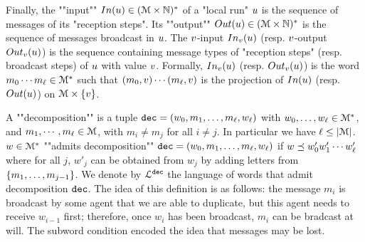 	Finally, the ""input"" $\Input{\localrun} \in (\messages \times \nats)^*$ of a "local run" $u$ is the sequence of messages of its "reception steps". Its ""output"" $\Output{\localrun} \in (\messages \times \nats)^*$ is the sequence of messages broadcast in $u$. The $v$-input $\vinput{\aval}{\localrun}$ (resp. $v$-output $\voutput{\aval}{\localrun}$) is the sequence containing message types of "reception steps" (resp. broadcast steps) of $u$ with value $v$. Formally, $\vinput{\aval}{\localrun}$ (resp. $\voutput{\aval}{\localrun}$) is the word $m_0 \cdots m_{\ell} \in \mathcal{M}^*$ such that $(m_0, v) \cdots (m_{\ell}, v)$ is the projection of $\Input{\localrun}$ (resp. $\Output{\localrun}$) on $\mathcal{M} \times \{v\}$. 
 
	A ""decomposition"" is a tuple $\mathtt{dec} = (w_0, m_1, \ldots, m_\ell, w_\ell)$ with $w_0, \ldots, w_\ell \in \mathcal{M}^*$, and $m_1, \cdots, m_\ell \in \mathcal{M}$, with $m_i \neq m_j$ for all $i\neq j$. In particular we have $\ell \leq |\mathcal{M}|$. 
	$w \in \mathcal{M}^*$ ""admits decomposition"" $\mathtt{dec} = (w_0, m_1, \ldots, m_\ell, w_\ell)$ if $w \preceq w'_0 w'_1 \cdots w'_\ell$ where for all $j$, $w'_j$ can be obtained from $w_j$ by adding letters from $\{m_1, \ldots, m_{j-1}\}$. 
	We denote by $\mathcal{L}^{\mathtt{\mathtt{dec}}}$ the language of words that admit decomposition $\mathtt{dec}$. 
	The idea of this definition is as follows: the message $m_i$ is broadcast by some agent that we are able to duplicate, but this agent needs to receive $w_{i-1}$ first; therefore, once $w_i$ has been broadcast, $m_i$ can be bradcast at will. The subword condition encoded the idea that messages may be lost. 

%	


